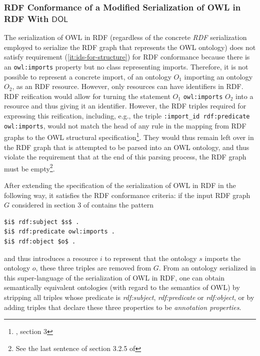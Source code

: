 \documentclass[10pt,fleqn,final]{scrreprt}
\newcommand{\cbs}[0]{\xspace}
\newcommand{\cbe}[0]{\xspace}
\newcommand*{\DOL}{\ensuremath{\mathsf{DOL}}\xspace}
\newcommand{\noterefname}{note}
\newcommand{\nref}[1]{\noterefname~\ref{#1}}
\renewcommand{\nref}[1]{\ref{nref-#1}} %
\providecommand{\DIFadd}[1]{{\protect\color{blue}\uwave{#1}}} %
\providecommand{\DIFaddbegin}{} %
\providecommand{\DIFaddend}{} %
\providecommand{\DIFdelbegin}{} %
\providecommand{\DIFdelend}{} %
\begin{document}
\subsubsection{RDF Conformance of a Modified Serialization of OWL in RDF With \DOL}

The serialization of OWL in RDF (regardless of the concrete \emph{RDF} serialization employed to serialize the RDF graph that represents the OWL ontology) does not satisfy \DIFdelbegin %
\DIFdelend requirement (\ref{it:ids-for-structure}) for RDF conformance because \DIFdelbegin %
\DIFdelend there is an \texttt{owl:imports} property but no class representing imports. 
Therefore, it is not possible to represent a concrete import, of an ontology $O_1$ importing an ontology $O_2$, as an RDF resource.
However, only resources can have identifiers in RDF.
RDF reification would allow for turning the statement $O_1$ \texttt{owl:imports} $O_2$ into a resource and thus giving it an identifier. 
However, the RDF triples required for expressing this reification, including, e.g., the triple \texttt{:import\_id rdf:predicate owl:imports},  would not match the head of any rule in the mapping from RDF graphs to the OWL structural specification\footnote{\DIFdelbegin %
\DIFdelend \DIFaddbegin \DIFadd{\nref{OWL2RDF}}\DIFaddend , section 3}. 
They would thus remain left over in the RDF graph that is attempted to be parsed into an OWL ontology, and thus violate the requirement that at the end of this parsing process, the RDF graph must be empty\footnote{See the last sentence of section 3.2.5 of \DIFdelbegin %
\DIFdelend \DIFaddbegin \DIFadd{\nref{OWL2RDF}}\DIFaddend }.

After extending the specification of the serialization of OWL in RDF in the following way, it satisfies the RDF conformance criteria: if the input RDF graph $G$ considered in section 3 of \DIFdelbegin %
\DIFdelend \DIFaddbegin \DIFadd{\nref{OWL2RDF} }\DIFaddend contains the pattern

\begin{lstlisting}[basicstyle=\small\ttfamily,language=N3,mathescape]
$i$ rdf:subject $s$ .
$i$ rdf:predicate owl:imports .
$i$ rdf:object $o$ .
\end{lstlisting}

and thus introduces a resource $i$ to represent that the ontology $s$ imports the ontology $o$, these three triples are removed from $G$.
From an ontology serialized in this super-language of the serialization of OWL in RDF, one can obtain semantically equivalent ontologies (with regard to the semantics of OWL) by stripping all triples whose predicate is \textit{rdf:subject}, \textit{rdf:predicate} or \textit{rdf:object}, or by adding triples that declare these three properties to be \emph{annotation properties}.
\end{document}
